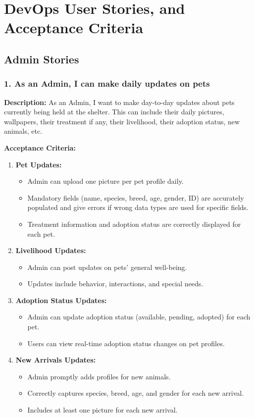 \section{DevOps User Stories, and Acceptance Criteria}
\subsection{Admin Stories}
\subsubsection*{1. As an Admin, I can make daily updates on pets}
\textbf{Description:} As an Admin, I want to make day-to-day updates about pets currently being held at the shelter. This can include their daily pictures, wallpapers, their treatment if any, their livelihood, their adoption status, new animals, etc.

\textbf{Acceptance Criteria:}
\begin{enumerate}
    \item \textbf{Pet Updates:}
    \begin{itemize}
        \item Admin can upload one picture per pet profile daily.
        \item Mandatory fields (name, species, breed, age, gender, ID) are accurately populated and give errors if wrong data types are used for specific fields.
        \item Treatment information and adoption status are correctly displayed for each pet.
    \end{itemize}
    
    \item \textbf{Livelihood Updates:}
    \begin{itemize}
        \item Admin can post updates on pets' general well-being.
        \item Updates include behavior, interactions, and special needs.
    \end{itemize}
    
    \item \textbf{Adoption Status Updates:}
    \begin{itemize}
        \item Admin can update adoption status (available, pending, adopted) for each pet.
        \item Users can view real-time adoption status changes on pet profiles.
    \end{itemize}
    
    \item \textbf{New Arrivals Updates:}
    \begin{itemize}
        \item Admin promptly adds profiles for new animals.
        \item Correctly captures species, breed, age, and gender for each new arrival.
        \item Includes at least one picture for each new arrival.
    \end{itemize}
\end{enumerate}

